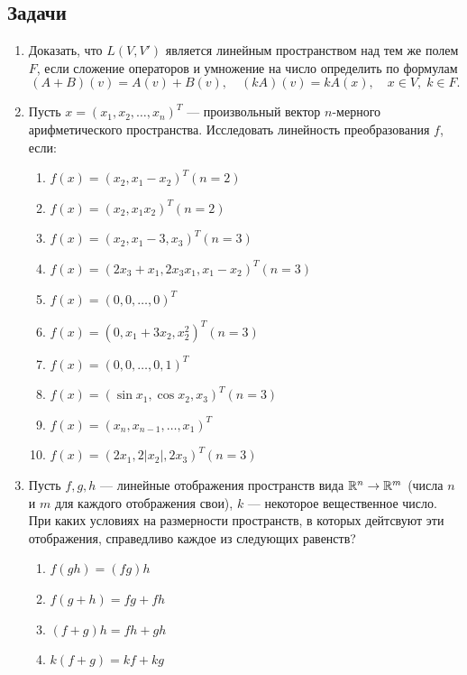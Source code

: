 \subsection*{Задачи}

\begin{enumerate}
\item Доказать, что $L(V,V')$ является линейным пространством над тем же полем $F$, если сложение операторов и умножение на число определить по формулам
$$
(A+B)(v) = A(v)+B(v),\quad (kA)(v) = kA(x),\quad x\in V,\; k\in F.
$$

\item  Пусть $x = (x_1, x_2, \dots, x_n)^T$ --- произвольный вектор $n$-мерного
арифметического пространства. Исследовать линейность преобразования $f$, если:
\begin{enumerate}
\item $f(x) = (x_2, x_1 - x_2)^T (n = 2)$
\item $f(x) = (x_2, x_1 x_2)^T (n = 2)$
\item $f(x) = (x_2, x_1 - 3, x_3)^T (n = 3)$
\item $f(x) = (2x_3 + x_1, 2x_3 x_1, x_1 - x_2)^T (n = 3)$
\item $f(x) = (0, 0, \dots , 0)^T$
\item $f(x) = (0, x_1 + 3x_2, x_2^2)^T (n = 3)$
\item $f(x) = (0, 0, \dots, 0, 1)^T$
\item $f(x) = (\sin x_1, \cos x_2, x_3)^T (n = 3)$
\item $f(x) = (x_n, x_{n-1}, \dots, x_1)^T$
\item $f(x) = (2x_1, 2|x_2|, 2x_3)^T (n = 3)$
\end{enumerate}

\item Пусть $f, g, h$ --- линейные отображения пространств вида $\mathbb R^n\to\mathbb R^m$ (числа $n$ и $m$ для каждого отображения свои), $k$ --- некоторое вещественное число.
При каких условиях на размерности пространств, в которых дейтсвуют эти отображения, справедливо каждое из следующих равенств?
\begin{enumerate}
\item $f(gh) = (fg)h$
\item $f(g + h) = fg + fh$
\item $(f + g)h = fh + gh$
\item $k(f + g) = kf + kg$
\end{enumerate}



\end{enumerate}



